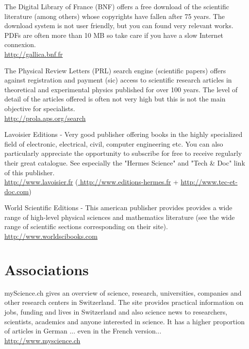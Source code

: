	
	{\Large {}}{\Large {}}{\Large {}}{\Large {}} The Digital Library of France (BNF) offers a free download of the scientific literature (among others) whose copyrights have fallen after 75 years. The download system is not user friendly, but you can found very relevant works. PDFs are often more than 10 MB so take care if you have a slow Internet connexion.\\
	\href{http://gallica.bnf.fr}{\color{blue} http://gallica.bnf.fr}
	
	{\Large {}}{\Large {}}{\Large {}}{\Large {}} The Physical Review Letters (PRL) search engine (scientific papers) offers against registration and payment (sic) access to scientific research articles in theoretical and experimental physics published for over 100 years. The level of detail of the articles offered is often not very high but this is not the main objective for specialists.\\
	\href{http://prola.aps.org/search}{\color{blue} http://prola.aps.org/search}
	
	\pagebreak
	{\Large {}}{\Large {}}{\Large {}} Lavoisier Editions - Very good publisher offering books in the highly specialized field of electronic, electrical, civil, computer engineering etc. You can also particularly appreciate the opportunity to subscribe for free to receive regularly their great catalogue. See especially the "Hermes Science" and "Tech \& Doc" link of this publisher.\\
	\href{http://www.lavoisier.fr}{\color{blue} http://www.lavoisier.fr} (\href{http://www.editions-hermes.fr}{\color{blue} http://www.editions-hermes.fr} + \href{http://www.tec-et-doc.com}{\color{blue} http://www.tec-et-doc.com})
	
	{\Large {}}{\Large {}}{\Large {}} World Scientific Editions - This american publisher provides provides a wide range of high-level physical sciences and mathematics literature (see the wide range of scientific sections corresponding on their site).\\
	\href{http://www.worldscibooks.com}{\color{blue}http://www.worldscibooks.com}
	
	\section{Associations}

		{\Large {}} myScience.ch gives an overview of science, research, universities, companies and other research centers in Switzerland. The site provides practical information on jobs, funding and lives in Switzerland and also science news to researchers, scientists, academics and anyone interested in science. It has a higher proportion of articles in German ... even in the French version...\\
		\href{http://www.myscience.ch}{\color{blue}http://www.myscience.ch}
		

